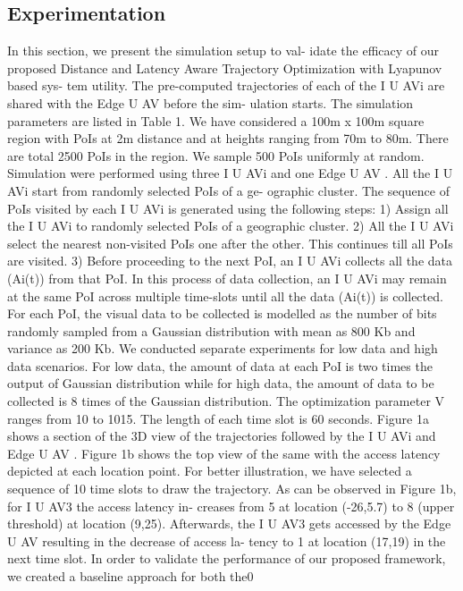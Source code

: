 \documentclass{article}
\begin{document}
\begin{multicols}{2}
\section{Experimentation}
In this section, we present the simulation setup to val-
idate the efficacy of our proposed Distance and Latency
Aware Trajectory Optimization with Lyapunov based sys-
tem utility. The pre-computed trajectories of each of the
I U AVi are shared with the Edge U AV before the sim-
ulation starts. The simulation parameters are listed in
Table 1.
We have considered a 100m x 100m square region with
PoIs at 2m distance and at heights ranging from 70m
to 80m. There are total 2500 PoIs in the region. We
sample 500 PoIs uniformly at random. Simulation were
performed using three I U AVi and one Edge U AV . All
the I U AVi start from randomly selected PoIs of a ge-
ographic cluster. The sequence of PoIs visited by each
I U AVi is generated using the following steps: 1) Assign
all the I U AVi to randomly selected PoIs of a geographic
cluster. 2) All the I U AVi select the nearest non-visited
PoIs one after the other. This continues till all PoIs are
visited. 3) Before proceeding to the next PoI, an I U AVi
collects all the data (Ai(t)) from that PoI. In this process
of data collection, an I U AVi may remain at the same
PoI across multiple time-slots until all the data (Ai(t)) is
collected. For each PoI, the visual data to be collected is
modelled as the number of bits randomly sampled from a
Gaussian distribution with mean as 800 Kb and variance
as 200 Kb. We conducted separate experiments for low
data and high data scenarios. For low data, the amount
of data at each PoI is two times the output of Gaussian
distribution while for high data, the amount of data to be
collected is 8 times of the Gaussian distribution.
The optimization parameter V ranges from 10 to 1015.
The length of each time slot is 60 seconds. Figure 1a
shows a section of the 3D view of the trajectories followed
by the I U AVi and Edge U AV . Figure 1b shows the top
view of the same with the access latency depicted at each
location point. For better illustration, we have selected a
sequence of 10 time slots to draw the trajectory. As can be
observed in Figure 1b, for I U AV3 the access latency in-
creases from 5 at location (-26,5.7) to 8 (upper threshold)
at location (9,25). Afterwards, the I U AV3 gets accessed
by the Edge U AV resulting in the decrease of access la-
tency to 1 at location (17,19) in the next time slot.
In order to validate the performance of our proposed
framework, we created a baseline approach for both the0

\end{multicols}
\end{document}
